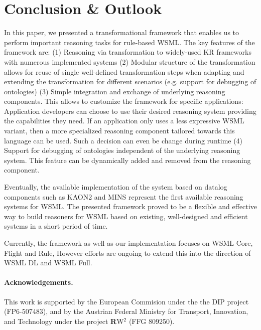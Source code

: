 \section{Conclusion \& Outlook\label{sec:outlook}}
In this paper, we presented a transformational framework that
enables us to perform important reasoning tasks for rule-based
WSML. The key features of the framework are: (1) Reasoning via
transformation to widely-used KR frameworks with numerous
implemented systems (2) Modular structure of the transformation
allows for reuse of single well-defined transformation steps when
adapting and extending the transformation for different scenarios
(e.g. support for debugging of ontologies) (3) Simple integration
and exchange of underlying reasoning components. This allows to
customize the framework for specific applications: Application
developers can choose to use their desired reasoning system
providing the capabilities they need. If an application only uses
a less expressive WSML variant, then a more specialized reasoning
component tailored towards this language can be used. Such a
decision can even be change during runtime (4) Support for
debugging of ontologies independent of the underlying reasoning
system. This feature can be dynamically added and removed from the
reasoning component.

 Eventually, the available implementation of the
system based on datalog components such as KAON2 and MINS
represent the first available reasoning systems for WSML. The
presented framework proved to be a flexible and effective way to
build reasoners for WSML based on existing, well-designed and
efficient systems in a short period of time.

Currently, the framework as well as our implementation focuses on
WSML Core, Flight and Rule, However efforts are ongoing to extend
this into the direction of WSML DL and WSML Full.
%
%
%
%
%
%


\paragraph{Acknowledgements.}
This work is supported by the European Commision under the the DIP
project (FP6-507483), and by the Austrian Federal Ministry for
Transport, Innovation, and Technology under the project {\sffamily
 {\bfseries R}W$^{\mathsf{2}}$} (FFG 809250).
